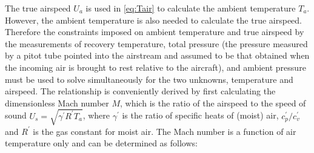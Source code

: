 \documentclass[
  english,
]{book}
\begin{document}
The true airspeed \(U_a\) is used in \eqref{eq:Tair} to calculate the ambient temperature \(T_a\). However, the ambient temperature is also needed to calculate the true airspeed. Therefore the constraints imposed on ambient temperature and true airspeed by the measurements of recovery temperature, total pressure (the pressure measured by a pitot tube pointed into the airstream and assumed to be that obtained when the incoming air is brought to rest relative to the aircraft), and ambient pressure must be used to solve simultaneously for the two unknowns, temperature and airspeed.
The relationship is conveniently derived by first calculating the dimensionless Mach number \(M\), which is the ratio of the airspeed to the speed of sound \(U_{s}=\sqrt{\gamma^{\prime}R^{\prime}T_{a}}\), where \(\gamma^\prime\) is the ratio of specific heats of (moist) air, \(c_p^\prime /c_v^\prime\) and \(R^\prime\) is the gas constant for moist air. The Mach number is a function of air temperature only and can be determined as follows:
\end{document}
